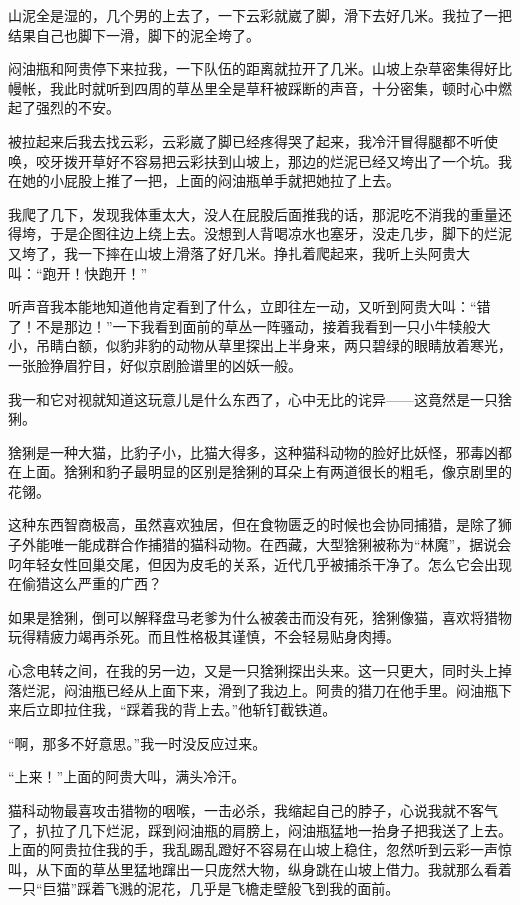 山泥全是湿的，几个男的上去了，一下云彩就崴了脚，滑下去好几米。我拉了一把结果自己也脚下一滑，脚下的泥全垮了。

闷油瓶和阿贵停下来拉我，一下队伍的距离就拉开了几米。山坡上杂草密集得好比幔帐，我此时就听到四周的草丛里全是草秆被踩断的声音，十分密集，顿时心中燃起了强烈的不安。

被拉起来后我去找云彩，云彩崴了脚已经疼得哭了起来，我冷汗冒得腿都不听使唤，咬牙拨开草好不容易把云彩扶到山坡上，那边的烂泥已经又垮出了一个坑。我在她的小屁股上推了一把，上面的闷油瓶单手就把她拉了上去。

我爬了几下，发现我体重太大，没人在屁股后面推我的话，那泥吃不消我的重量还得垮，于是企图往边上绕上去。没想到人背喝凉水也塞牙，没走几步，脚下的烂泥又垮了，我一下摔在山坡上滑落了好几米。挣扎着爬起来，我听上头阿贵大叫：“跑开！快跑开！”

听声音我本能地知道他肯定看到了什么，立即往左一动，又听到阿贵大叫：“错了！不是那边！”一下我看到面前的草丛一阵骚动，接着我看到一只小牛犊般大小，吊睛白额，似豹非豹的动物从草里探出上半身来，两只碧绿的眼睛放着寒光，一张脸狰眉狞目，好似京剧脸谱里的凶妖一般。

我一和它对视就知道这玩意儿是什么东西了，心中无比的诧异——这竟然是一只猞猁。

猞猁是一种大猫，比豹子小，比猫大得多，这种猫科动物的脸好比妖怪，邪毒凶都在上面。猞猁和豹子最明显的区别是猞猁的耳朵上有两道很长的粗毛，像京剧里的花翎。

这种东西智商极高，虽然喜欢独居，但在食物匮乏的时候也会协同捕猎，是除了狮子外能唯一能成群合作捕猎的猫科动物。在西藏，大型猞猁被称为“林魔”，据说会叼年轻女性回巢交尾，但因为皮毛的关系，近代几乎被捕杀干净了。怎么它会出现在偷猎这么严重的广西？

如果是猞猁，倒可以解释盘马老爹为什么被袭击而没有死，猞猁像猫，喜欢将猎物玩得精疲力竭再杀死。而且性格极其谨慎，不会轻易贴身肉搏。

心念电转之间，在我的另一边，又是一只猞猁探出头来。这一只更大，同时头上掉落烂泥，闷油瓶已经从上面下来，滑到了我边上。阿贵的猎刀在他手里。闷油瓶下来后立即拉住我，“踩着我的背上去。”他斩钉截铁道。

“啊，那多不好意思。”我一时没反应过来。

“上来！”上面的阿贵大叫，满头冷汗。

猫科动物最喜攻击猎物的咽喉，一击必杀，我缩起自己的脖子，心说我就不客气了，扒拉了几下烂泥，踩到闷油瓶的肩膀上，闷油瓶猛地一抬身子把我送了上去。上面的阿贵拉住我的手，我乱踢乱蹬好不容易在山坡上稳住，忽然听到云彩一声惊叫，从下面的草丛里猛地蹿出一只庞然大物，纵身跳在山坡上借力。我就那么看着一只“巨猫”踩着飞溅的泥花，几乎是飞檐走壁般飞到我的面前。

